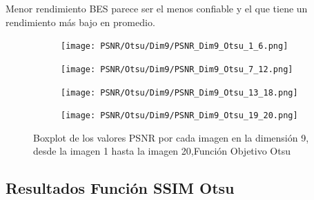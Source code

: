 \documentclass[conference]{IEEEtran}
\begin{document}
\noindent Menor rendimiento BES parece ser el menos confiable y el que tiene un rendimiento más bajo en promedio.
\begin{figure}
	\centering
	\begin{subfigure}{0.4\textwidth}
		\texttt{[image: PSNR/Otsu/Dim9/PSNR\_Dim9\_Otsu\_1\_6.png]}
	\end{subfigure}
	
	\begin{subfigure}{0.4\textwidth}
		\texttt{[image: PSNR/Otsu/Dim9/PSNR\_Dim9\_Otsu\_7\_12.png]}
	\end{subfigure}
	\begin{subfigure}{0.4\textwidth}
		\texttt{[image: PSNR/Otsu/Dim9/PSNR\_Dim9\_Otsu\_13\_18.png]}
	\end{subfigure}
	\begin{subfigure}{0.4\textwidth}
		\texttt{[image: PSNR/Otsu/Dim9/PSNR\_Dim9\_Otsu\_19\_20.png]}
		\vspace{-120pt} %
	\end{subfigure}
	\caption{Boxplot de los valores PSNR por cada imagen en la dimensión 9, desde la imagen 1 hasta la imagen 20,Función Objetivo Otsu}
	\label{fig:imagenes}    
\end{figure}

\subsection{Resultados Función SSIM Otsu}
\end{document}
